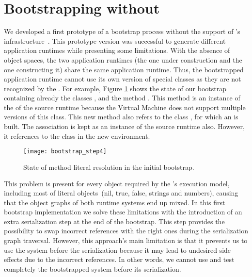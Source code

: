 \section{Bootstrapping without \Vtt}

We developed a first prototype of a bootstrap process without the support of \Vtt's infrastructure~\cite{Poli14c}. This prototype version was successful to generate different application runtimes while presenting some limitations. With the absence of object spaces, the two application runtimes (the one under construction and the one constructing it) share the same application runtime. Thus, the bootstrapped application runtime cannot use its own version of special classes as they are not recognized by the \VM. For example, Figure \ref{fig:bootstrap_step4} shows the state of our bootstrap containing already the classes ,  and the method . This method is an instance of the  of the source runtime because the Virtual Machine does not support multiple versions of this class.
This new method also refers to the class , for which an  is built.
The association is kept as an instance of the source runtime also.
However, it references to the  class in the new environment.

\begin{figure}[ht]
\begin{center}
\texttt{[image: bootstrap\_step4]}
\caption{State of method literal resolution in the initial bootstrap.\label{fig:bootstrap_step4}}
\end{center}
\end{figure}

This problem is present for every object required by the \VM's execution model, including most of literal objects~(nil, true, false, strings and numbers), causing that the object graphs of both runtime systems end up mixed.
In this first bootstrap implementation we solve these limitations with the introduction of an extra serialization step at the end of the bootstrap.
This step provides the possibility to swap incorrect references with the right ones during the serialization graph traversal.
However, this approach's main limitation is that it prevents us to use the system before the serialization because it may lead to undesired side effects due to the incorrect references.
In other words, we cannot use and test completely the bootstrapped system before its serialization.

